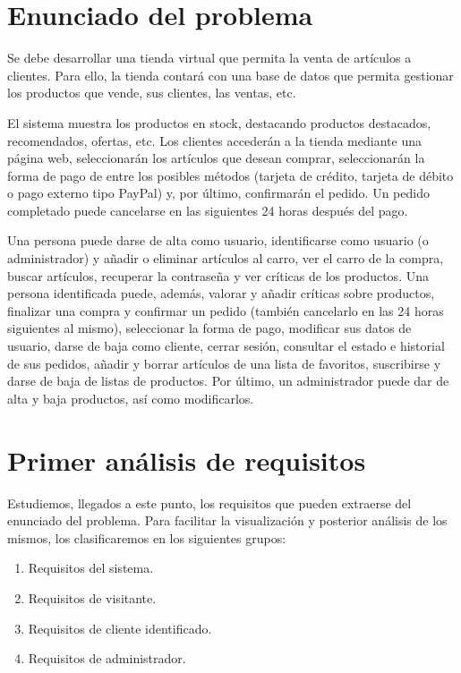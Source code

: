 \section{Enunciado del problema}
\label{enunciado}

Se	  debe	  desarrollar	  una	  tienda	  virtual	  que	  permita	  la	  venta	  de	  artículos	  a	  clientes.	  
Para	  ello,	  la	  tienda	  contará	  con	  una	  base	  de	  datos	  que	  permita	  gestionar	  los	  
productos	  que	  vende,	  sus	  clientes,	  las	  ventas,	  etc.

	  	  
El sistema muestra los productos en stock, destacando productos destacados, recomendados, ofertas, etc. Los	  clientes	  accederán	  a	  la	  tienda	  mediante	  una	  página	  web,	  seleccionarán	  los	  
artículos	  que	  desean	  comprar, seleccionarán la forma de pago de entre los posibles métodos	(tarjeta	  
de	  crédito, tarjeta de  débito  o	  pago externo tipo PayPal) y, por último, confirmarán el pedido. Un pedido completado puede cancelarse en las siguientes 24 horas después del pago.

Una persona puede darse de alta como usuario, identificarse como usuario (o administrador) y añadir o eliminar artículos al carro, ver el carro de la compra, buscar artículos, recuperar la contraseña y ver críticas de los productos. Una persona identificada puede, además, valorar y añadir críticas sobre productos, finalizar una compra y confirmar un pedido (también cancelarlo en las 24 horas siguientes al mismo), seleccionar la forma de pago, modificar sus datos de usuario, darse de baja como cliente, cerrar sesión, consultar el estado e historial de sus pedidos, añadir y borrar artículos de una lista de favoritos, suscribirse y darse de baja de listas de productos. Por último, un administrador puede dar de alta y baja productos, así como modificarlos.

\section{Primer análisis de requisitos}

Estudiemos, llegados a este punto, los requisitos que pueden extraerse del enunciado del problema. Para facilitar la visualización y posterior análisis de los mismos, los clasificaremos en los siguientes grupos:

\begin{enumerate}
\item Requisitos del sistema.
\item Requisitos de visitante.
\item Requisitos de cliente identificado.
\item Requisitos de administrador.
\end{enumerate}

